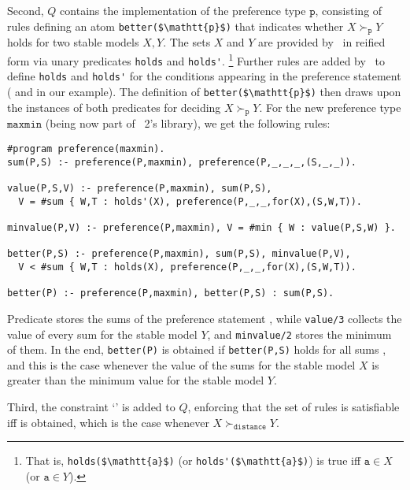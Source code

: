 Second, %
$Q$ contains the implementation of the preference type $\mathtt{p}$,
consisting of rules defining an atom \lstinline[mathescape]!better($\mathtt{p}$)! 
that indicates whether $X\succ_{\mathtt{p}}Y$ holds for two stable models $X,Y$.
The sets $X$ and $Y$ are provided by \asprin\ in reified form via unary predicates \lstinline!holds! and \lstinline!holds'!\!.%
\footnote{That is, \lstinline[mathescape]!holds($\mathtt{a}$)!\! (or \lstinline!holds'!\!\!\lstinline[mathescape]!($\mathtt{a}$)!\!) is true iff $\mathtt{a}\!\in\!X$ (or $\mathtt{a}\!\in\!Y$).}
%
Further rules are added by \asprin\ to define \lstinline!holds! and \lstinline!holds'! for
the conditions appearing in the preference statement ( and  in our example).
%
The definition of \lstinline[mathescape]!better($\mathtt{p}$)! then draws upon the instances of both predicates for deciding $X\succ_{\mathtt{p}}Y$.
%
For the new preference type $\mathtt{maxmin}$ (being now part of \asprin\ 2's library),
we get the following rules:
%
\begin{lstlisting}
#program preference(maxmin).
sum(P,S) :- preference(P,maxmin), preference(P,_,_,_,(S,_,_)).

value(P,S,V) :- preference(P,maxmin), sum(P,S), 
  V = #sum { W,T : holds'(X), preference(P,_,_,for(X),(S,W,T)).

minvalue(P,V) :- preference(P,maxmin), V = #min { W : value(P,S,W) }.

better(P,S) :- preference(P,maxmin), sum(P,S), minvalue(P,V),
  V < #sum { W,T : holds(X), preference(P,_,_,for(X),(S,W,T)).

better(P) :- preference(P,maxmin), better(P,S) : sum(P,S).
\end{lstlisting}
Predicate  stores the sums  of the preference statement ,  
while \lstinline!value/3! collects the value  of every sum for the stable model $Y$, 
and \lstinline!minvalue/2! stores the minimum of them.
In the end, \lstinline{better(P)} is obtained if \lstinline{better(P,S)} holds for all sums , 
and this is the case whenever the value of the sums for the stable model $X$ 
is greater than the minimum value for the stable model $Y$.

Third, %
the constraint
`'
is added to $Q$, %
enforcing that 
the set of rules is satisfiable iff  is obtained, 
which is the case whenever $X \succ_\mathtt{distance} Y$. 

